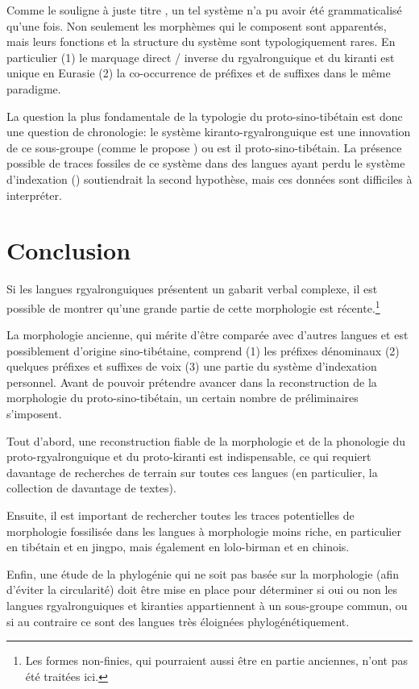 \documentclass[oldfontcommands,oneside,a4paper,11pt]{article}
\begin{document}
 Comme le souligne à juste titre \citet{delancey14second}, un tel système n'a pu avoir été grammaticalisé qu'une fois. Non seulement les morphèmes qui le composent sont apparentés, mais leurs fonctions et la structure du système sont typologiquement  rares. En particulier (1) le marquage direct / inverse du rgyalronguique et du kiranti est unique en Eurasie (2) la co-occurrence de préfixes et de suffixes dans le même paradigme.
 
 La question la plus fondamentale de la typologie du proto-sino-tibétain est donc une question de chronologie: le système kiranto-rgyalronguique est une innovation de ce sous-groupe (comme le propose \citealt{lapolla03}) ou est il proto-sino-tibétain. La présence possible de traces fossiles de ce système dans des langues ayant perdu le système d'indexation (\citealt{jacques10zos}) soutiendrait la second hypothèse, mais ces données sont difficiles à interpréter.
 
 
\section{Conclusion}
Si les langues rgyalronguiques présentent un gabarit verbal complexe, il est possible de montrer qu'une grande partie de cette morphologie est récente.\footnote{Les formes non-finies, qui pourraient aussi être en partie anciennes, n'ont pas été traitées ici.}

La morphologie ancienne, qui mérite d'être comparée avec d'autres langues et est possiblement d'origine sino-tibétaine, comprend (1) les préfixes dénominaux (2) quelques préfixes et suffixes de voix (3) une partie du système d'indexation personnel. Avant de pouvoir prétendre avancer dans la reconstruction de la morphologie du proto-sino-tibétain, un certain nombre de préliminaires s'imposent.

Tout d'abord, une reconstruction fiable de la morphologie et de la phonologie du proto-rgyalronguique et du proto-kiranti est indispensable, ce qui requiert davantage de recherches de terrain sur toutes ces langues (en particulier, la collection de davantage de textes).

Ensuite, il est important de rechercher toutes les traces potentielles de morphologie fossilisée dans les langues à morphologie moins riche, en particulier en tibétain et en jingpo, mais également en lolo-birman et en chinois.

 Enfin, une étude de la phylogénie qui ne soit pas basée sur la morphologie (afin d'éviter la circularité) doit être mise en place pour déterminer si oui ou non les langues rgyalronguiques et kiranties appartiennent à un sous-groupe  commun, ou si au contraire ce sont des langues très éloignées phylogénétiquement.
 


\end{document}
